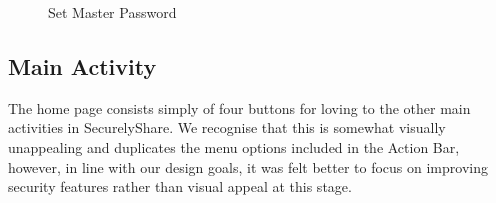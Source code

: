 \begin{figure}[h!]
                                                                                                                                                                                                          
    \caption{Set Master Password }
    \label{fig:alert}
\end{figure}

\subsection*{Main Activity}
The home page consists simply of four buttons for loving to the other main activities in SecurelyShare.  We recognise that this is somewhat visually unappealing and duplicates the menu options included in the Action Bar, however, in line with our design goals, it was felt better to focus on improving security features rather than visual appeal at this stage.

